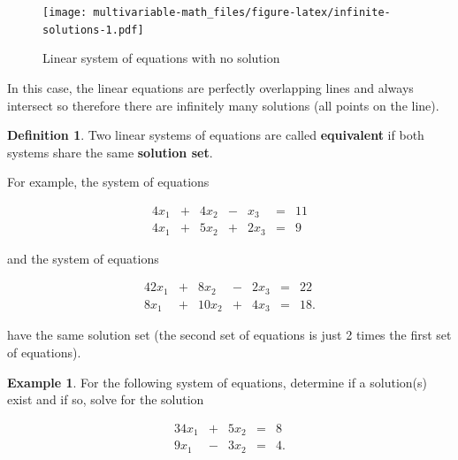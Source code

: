 \documentclass[
]{book}
\theoremstyle{definition}
\newtheorem{definition}{Definition}[chapter]
\theoremstyle{definition}
\newtheorem{example}{Example}[chapter]
\theoremstyle{definition}
\theoremstyle{definition}
\theoremstyle{remark}
\begin{document}
\begin{figure}
\centering
\texttt{[image: multivariable-math\_files/figure-latex/infinite-solutions-1.pdf]}
\caption{\label{fig:infinite-solutions}Linear system of equations with no solution}
\end{figure}

In this case, the linear equations are perfectly overlapping lines and always intersect so therefore there are infinitely many solutions (all points on the line).

\begin{definition}
Two linear systems of equations are called \textbf{equivalent} if both systems share the same \textbf{solution set}.
\end{definition}

For example, the system of equations

\begin{alignat*}{4}
x_1   & {}+{} & 4 x_2 & {}-{} & x_3 & {}={} & 11 \\
4 x_1 & {}+{} & 5 x_2 & {}+{} & 2 x_3 & {}={} & 9
\end{alignat*}

and the system of equations

\begin{alignat*}{4}
2x_1   & {}+{} & 8 x_2 & {}-{} & 2 x_3 & {}={} & 22 \\
8 x_1 & {}+{} & 10 x_2 & {}+{} & 4 x_3 & {}={} & 18.
\end{alignat*}

have the same solution set (the second set of equations is just 2 times the first set of equations).

\begin{example}
For the following system of equations, determine if a solution(s) exist and if so, solve for the solution

\begin{alignat*}{3}
4 x_1 & {}+{} & 5 x_2 & {}={} & 8 \\
9 x_1 & {}-{} & 3 x_2 & {}={} & 4.
\end{alignat*}
\end{example}
\end{document}
